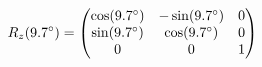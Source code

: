 \documentclass[preview]{standalone}
\begin{document}
\begin{align*}
\special{dvisvgm:raw <g id='unique000'>}R_z(9.7^\circ) = \begin{pmatrix} \cos(9.7^\circ) & -\sin(9.7^\circ) & 0 \\ \sin(9.7^\circ) & \cos(9.7^\circ) & 0 \\ 0 & 0 & 1 \end{pmatrix}\special{dvisvgm:raw </g>}
\end{align*}
\end{document}
